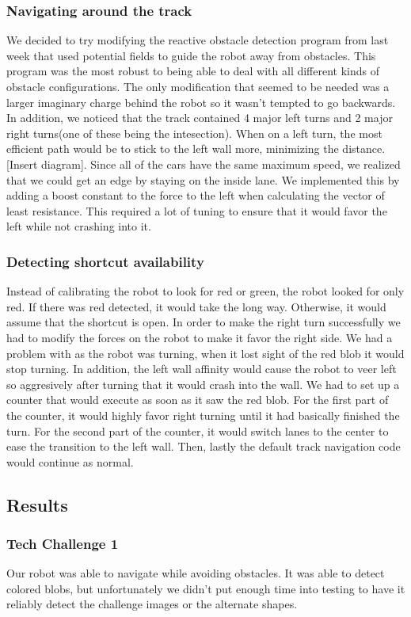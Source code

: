 \documentclass[journal, a4paper]{IEEEtran}
\begin{document}
\subsubsection{Navigating around the track}
We decided to try modifying the reactive obstacle detection program from last week that used potential fields to guide the robot away from obstacles. This program was the most robust to being able to deal with all different kinds of obstacle configurations. The only modification that seemed to be needed was a larger imaginary charge behind the robot so it wasn't tempted to go backwards. In addition, we noticed that the track contained 4 major left turns and 2 major right turns(one of these being the intesection). When on a left turn, the most efficient path would be to stick to the left wall more, minimizing the distance. [Insert diagram]. Since all of the cars have the same maximum speed, we realized that we could get an edge by staying on the inside lane. We implemented this by adding a boost constant to the force to the left when calculating the vector of least resistance. This required a lot of tuning to ensure that it would favor the left while not crashing into it. 
\subsubsection{Detecting shortcut availability}
Instead of calibrating the robot to look for red or green, the robot looked for only red. If there was red detected, it would take the long way. Otherwise, it would assume that the shortcut is open. In order to make the right turn successfully we had to modify the forces on the robot to make it favor the right side. We had a problem with as the robot was turning, when it lost sight of the red blob it would stop turning. In addition, the left wall affinity would cause the robot to veer left so aggresively after turning that it would crash into the wall. We had to set up a counter that would execute as soon as it saw the red blob. For the first part of the counter, it would highly favor right turning until it had basically finished the turn. For the second part of the counter, it would switch lanes to the center to ease the transition to the left wall. Then, lastly the default track navigation code would continue as normal. 
\subsection{Results}
\subsubsection{Tech Challenge 1}
Our robot was able to navigate while avoiding obstacles. It was able to detect colored blobs, but unfortunately we didn't put enough time into testing to have it reliably detect the challenge images or the alternate shapes.
\end{document}
